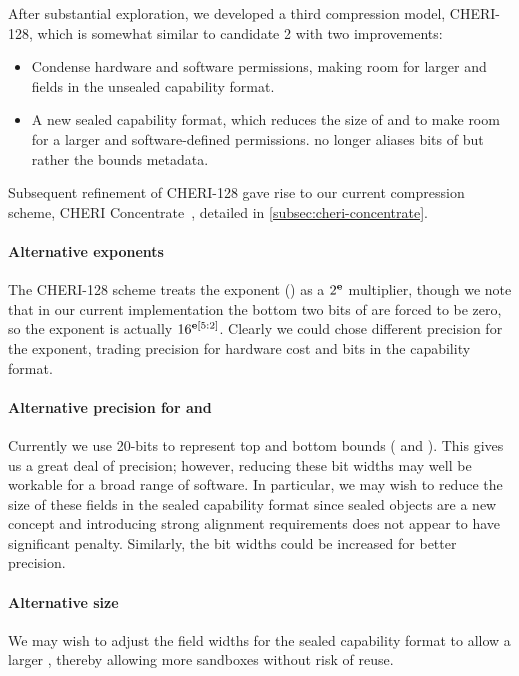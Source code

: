 After substantial exploration, we developed a third compression model,
CHERI-128, which is somewhat similar to candidate 2 with two improvements:

\begin{itemize}
\item Condense hardware and software permissions, making room for larger \cbasebits{} and \ctopbits{} fields in the unsealed capability format.
\item A new sealed capability format, which reduces the size of \cbasebits{} and \ctopbits{} to make room for a larger \cotype{} and software-defined permissions.
\cotype{} no longer aliases bits of \ccursor{} but rather the bounds
metadata.
\end{itemize}

Subsequent refinement of CHERI-128 gave rise to our current compression
scheme, CHERI Concentrate~\cite{Woodruff2019}, detailed in
\cref{subsec:cheri-concentrate}.

\paragraph{Alternative exponents}
The CHERI-128 scheme treats the
exponent (\cexponent{}) as a $2^{\bf e}{}$ multiplier, though we
note that in our current implementation the bottom two bits of
\cexponent{} are forced to be zero, so the exponent is actually
$16^{{\bf e}[5:2]}$.  Clearly we could chose different precision
for the exponent, trading precision for hardware cost and bits in the
capability format.

\paragraph{Alternative precision for \cT{} and \cB{}}
Currently we use 20-bits to represent top and bottom bounds (\cT{} and
\cB{}).  This gives us a great deal of precision; however, reducing these
bit widths may well be workable for a broad range of software.  In
particular, we may wish to reduce the size of these fields in the
sealed capability format since sealed objects are a new concept and
introducing strong alignment requirements does not appear to have
significant penalty.  Similarly, the bit widths could be increased for better
precision.

\paragraph{Alternative \cotype{} size}
We may wish to adjust the field widths for the sealed capability
format to allow a larger \cotype{}, thereby allowing more sandboxes
without risk of \cotype{} reuse.

